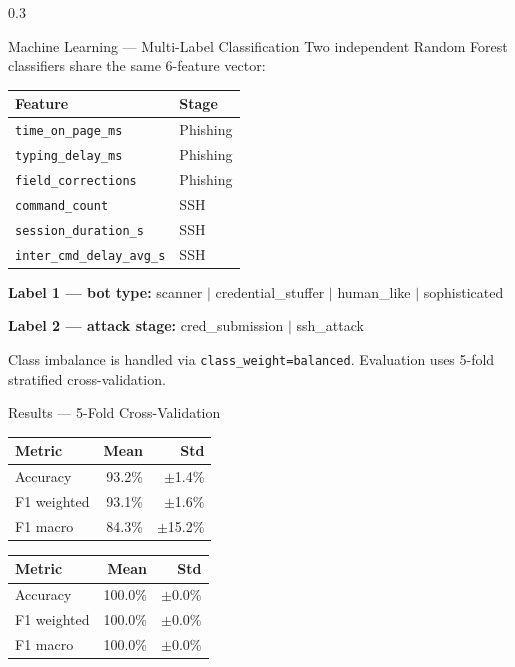 \documentclass[final]{beamer}
\begin{document}
\begin{frame}[fragile]
\begin{columns}[t]
\begin{column}{0.3\paperwidth}
\begin{block}{Machine Learning — Multi-Label Classification}
Two independent Random Forest classifiers share the same 6-feature vector:

\bigskip
\begin{center}
\begin{tabular}{ll}
\toprule
\textbf{Feature} & \textbf{Stage} \\
\midrule
\texttt{time\_on\_page\_ms}        & Phishing \\
\texttt{typing\_delay\_ms}         & Phishing \\
\texttt{field\_corrections}        & Phishing \\
\texttt{command\_count}            & SSH \\
\texttt{session\_duration\_s}      & SSH \\
\texttt{inter\_cmd\_delay\_avg\_s} & SSH \\
\bottomrule
\end{tabular}
\end{center}

\bigskip
\textbf{Label 1 — bot type:} scanner $|$ credential\_stuffer $|$
human\_like $|$ sophisticated

\textbf{Label 2 — attack stage:} cred\_submission $|$ ssh\_attack

\bigskip
Class imbalance is handled via \texttt{class\_weight=balanced}.
Evaluation uses 5-fold stratified cross-validation.
\end{block}

\begin{exampleblock}{Results — 5-Fold Cross-Validation}

\begin{center}
\begin{tabular}{lrr}
\toprule
\textbf{Metric} & \textbf{Mean} & \textbf{Std} \\
\midrule
Accuracy    & 93.2\% & $\pm$1.4\% \\
F1 weighted & 93.1\% & $\pm$1.6\% \\
F1 macro    & 84.3\% & $\pm$15.2\% \\
\bottomrule
\end{tabular}
\end{center}

\bigskip
{}
\begin{center}
\begin{tabular}{lrr}
\toprule
\textbf{Metric} & \textbf{Mean} & \textbf{Std} \\
\midrule
Accuracy    & 100.0\% & $\pm$0.0\% \\
F1 weighted & 100.0\% & $\pm$0.0\% \\
F1 macro    & 100.0\% & $\pm$0.0\% \\
\bottomrule
\end{tabular}
\end{center}


\end{exampleblock}
\end{column}
\end{columns}
\end{frame}
\end{document}
